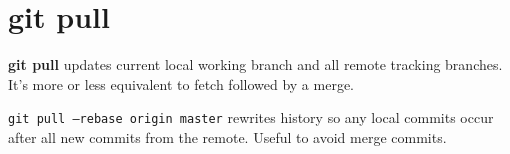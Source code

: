 %
\section{git pull}
\textbf{git pull} updates current local working branch  and all remote tracking branches.
It's more or less equivalent to fetch followed by a merge.

\texttt{git pull --rebase origin master} rewrites history so any local commits occur after all new commits from the remote.
Useful to avoid merge commits.

%